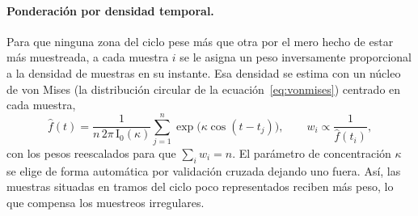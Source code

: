 \documentclass[12pt, a4paper]{report}
\begin{document}
\paragraph{Ponderación por densidad temporal.} Para que ninguna zona del ciclo pese más que otra por el mero hecho de estar más muestreada, a cada muestra $i$ se le asigna un peso inversamente proporcional a la densidad de muestras en su instante. Esa densidad se estima con un núcleo de von Mises (la distribución circular de la ecuación~\eqref{eq:vonmises}) centrado en cada muestra,
\begin{equation}
    \hat f(t) = \frac{1}{n\,2\pi\,\mathrm{I}_0(\kappa)}\sum_{j=1}^{n}\exp\!\big(\kappa\cos(t-t_j)\big),
    \qquad
    w_i \propto \frac{1}{\hat f(t_i)},
    \label{eq:fmm-pesos}
\end{equation}
con los pesos reescalados para que $\sum_i w_i = n$. El parámetro de concentración $\kappa$ se elige de forma automática por validación cruzada dejando uno fuera. Así, las muestras situadas en tramos del ciclo poco representados reciben más peso, lo que compensa los muestreos irregulares.
\end{document}

